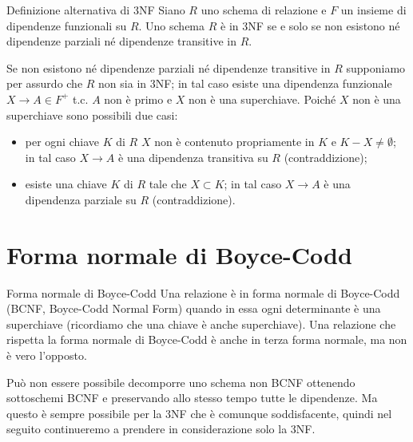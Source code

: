 \begin{Thm}{Definizione alternativa di 3NF}{}
    Siano $R$ uno schema di relazione e $F$ un insieme di dipendenze funzionali su $R$. Uno schema $R$ è in 3NF se e solo se non esistono né dipendenze parziali né dipendenze transitive in $R$.
    \begin{demonstration}
        Se non esistono né dipendenze parziali né dipendenze transitive in $R$ supponiamo per assurdo che $R$ non sia in 3NF; in tal caso esiste una dipendenza funzionale $X\to A\in F^+$ t.c. $A$ non è primo e $X$ non è una superchiave. Poiché $X$ non è una superchiave sono possibili due casi:
        \begin{itemize}
            \item per ogni chiave $K$ di $R$ $X$ non è contenuto propriamente in $K$ e $K-X\neq\emptyset$; in tal caso $X\to A$ è una dipendenza transitiva su $R$ (contraddizione);
            \item esiste una chiave $K$ di $R$ tale che $X\subset K$; in tal caso $X\to A$ è una dipendenza parziale su $R$ (contraddizione).
        \end{itemize}
    \end{demonstration}
\end{Thm}

\section{Forma normale di Boyce-Codd}
\begin{Definition}{Forma normale di Boyce-Codd}{}
    Una relazione è in forma normale di Boyce-Codd (BCNF, Boyce-Codd Normal Form) quando in essa ogni determinante è una superchiave (ricordiamo che una chiave è anche superchiave). Una relazione che rispetta la forma normale di Boyce-Codd è anche in terza forma normale, ma non è vero l'opposto.
\end{Definition}

Può non essere possibile decomporre uno schema non BCNF ottenendo sottoschemi BCNF e preservando allo stesso tempo tutte le dipendenze. Ma questo è sempre possibile per la 3NF che è comunque soddisfacente, quindi nel seguito continueremo a prendere in considerazione solo la 3NF.

